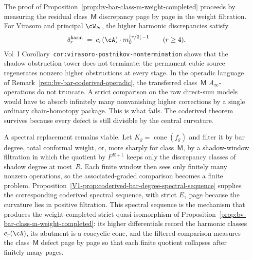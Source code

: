 \begin{remark}
\label{rem:bv-bar-class-m-frontier}
%
The proof of
Proposition~\ref{prop:bv-bar-class-m-weight-completed} proceeds by
measuring the residual class~$\mathsf{M}$ discrepancy page by page in
the weight filtration. For Virasoro and principal $\cW_N$, the higher
harmonic discrepancies satisfy
\[
\delta_r^{\mathrm{harm}}
\;=\;
c_r(\cA)\cdot m_0^{\lfloor r/2 \rfloor - 1}
\qquad (r \geq 4).
\]
Vol~I Corollary~\texttt{cor:virasoro-postnikov-nontermination} shows that the
shadow obstruction tower does not terminate: the permanent cubic
source regenerates nonzero higher obstructions at every stage. In the
operadic language of
Remark~\ref{rem:bv-bar-coderived-operadic}, the transferred
class~$\mathsf{M}$ $A_\infty$-operations do not truncate. A strict
comparison on the raw direct-sum models would have to absorb
infinitely many nonvanishing higher corrections by a single ordinary
chain-homotopy package. This is what fails. The coderived theorem
survives because every defect is still divisible by the central
curvature.

A spectral replacement remains viable. Let
$K_g = \operatorname{cone}(f_g)$ and filter it by bar degree, total
conformal weight, or, more sharply for class~$\mathsf{M}$, by a
shadow-window filtration in which the quotient by $F^{R+1}$ keeps only
the discrepancy classes of shadow degree at most~$R$. Each finite
window then sees only finitely many nonzero operations, so the
associated-graded comparison becomes a finite problem.
Proposition~\ref{V1-prop:coderived-bar-degree-spectral-sequence}
supplies the corresponding coderived spectral sequence, with strict
$E_1$ page because the curvature lies in positive filtration. This
spectral sequence is the mechanism that produces the weight-completed
strict quasi-isomorphism of
Proposition~\ref{prop:bv-bar-class-m-weight-completed}: its higher
differentials record the harmonic classes $c_r(\cA)$, its abutment is
a coacyclic cone, and the filtered comparison measures the
class~$\mathsf{M}$ defect page by page so that each finite quotient
collapses after finitely many pages.


\end{remark}
